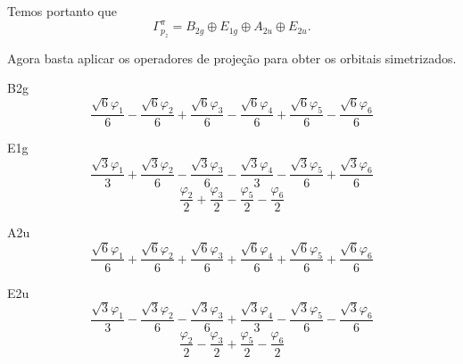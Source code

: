 \documentclass[a4paper,10pt]{article}
\begin{document}
Temos portanto que
$$
\Gamma^\pi_{p_z} = B_{2g} \oplus E_{1g} \oplus A_{2u} \oplus E_{2u}.
$$

Agora basta aplicar os operadores de projeção para obter os orbitais simetrizados.

B2g
$$
\frac{\sqrt{6} \varphi_{1}}{6} - \frac{\sqrt{6} \varphi_{2}}{6} + \frac{\sqrt{6} \varphi_{3}}{6} - \frac{\sqrt{6} \varphi_{4}}{6} + \frac{\sqrt{6} \varphi_{5}}{6} - \frac{\sqrt{6} \varphi_{6}}{6}
$$

E1g
$$
\frac{\sqrt{3} \varphi_{1}}{3} + \frac{\sqrt{3} \varphi_{2}}{6} - \frac{\sqrt{3} \varphi_{3}}{6} - \frac{\sqrt{3} \varphi_{4}}{3} - \frac{\sqrt{3} \varphi_{5}}{6} + \frac{\sqrt{3} \varphi_{6}}{6}
$$
$$
\frac{\varphi_{2}}{2} + \frac{\varphi_{3}}{2} - \frac{\varphi_{5}}{2} - \frac{\varphi_{6}}{2}
$$

A2u
$$
\frac{\sqrt{6} \varphi_{1}}{6} + \frac{\sqrt{6} \varphi_{2}}{6} + \frac{\sqrt{6} \varphi_{3}}{6} + \frac{\sqrt{6} \varphi_{4}}{6} + \frac{\sqrt{6} \varphi_{5}}{6} + \frac{\sqrt{6} \varphi_{6}}{6}
$$

E2u
$$
\frac{\sqrt{3} \varphi_{1}}{3} - \frac{\sqrt{3} \varphi_{2}}{6} - \frac{\sqrt{3} \varphi_{3}}{6} + \frac{\sqrt{3} \varphi_{4}}{3} - \frac{\sqrt{3} \varphi_{5}}{6} - \frac{\sqrt{3} \varphi_{6}}{6}
$$
$$
\frac{\varphi_{2}}{2} - \frac{\varphi_{3}}{2} + \frac{\varphi_{5}}{2} - \frac{\varphi_{6}}{2}
$$
\end{document}
